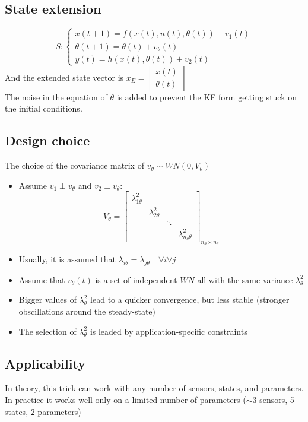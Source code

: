 \documentclass{article}
\begin{document}
\subsection{State extension}
\[
S:\begin{cases}
x(t+1)=f(x(t),u(t),\theta(t))+v_1(t)\\
\theta(t+1)=\theta(t)+v_\theta(t)\\
y(t)=h(x(t),\theta(t))+v_2(t)
\end{cases}
\]
And the extended state vector is $x_E=\begin{bmatrix}
x(t)\\\theta(t)
\end{bmatrix}
$\\
The noise in the equation of $\theta$ is added to prevent the KF form getting stuck on the initial conditions.
\subsection{Design choice} The choice of the covariance matrix of $v_\theta\sim WN(0,V_\theta)$\\
\begin{itemize}
\item Assume $v_1\perp v_\theta$ and $v_2\perp v_\theta$:
\[
V_\theta=\begin{bmatrix}
\lambda_{1\theta}^2\\
&\lambda_{2\theta}^2\\
&&\ddots\\
&&&\lambda_{n_\theta \theta}^2
\end{bmatrix}_{n_\theta \times n_\theta}
\]
\item Usually, it is assumed that $\lambda_{i\theta}=\lambda_{j\theta} \quad \forall i \forall j$
\item Assume that $v_\theta(t)$ is a set of \underline{independent} $WN$ all with the same variance $\lambda_\theta^2$
\item Bigger values of $\lambda_\theta^2$ lead to a quicker convergence, but less stable (stronger obscillations around the steady-state)
\item The selection of $\lambda_\theta^2$ is leaded by application-specific constraints
\end{itemize}
\subsection{Applicability} In theory, this trick can work with any number of sensors, states, and parameters. In practice it works well only on a limited number of parameters ($\sim$3 sensors, 5 states, 2 parameters)
\end{document}
